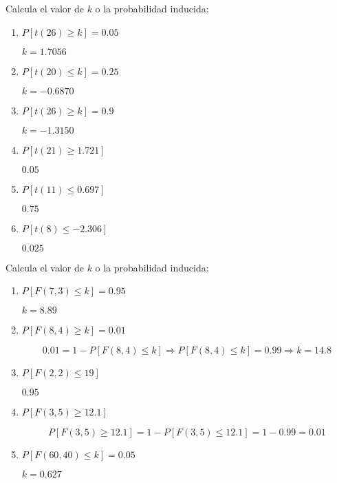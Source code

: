 \begin{ejercicio}
    Calcula el valor de $k$ o la probabilidad inducida:
    \begin{enumerate}[label=\alph*)]
        \item $P[t(26)\geq k] = 0.05$

            $k = 1.7056$
        \item $P[t(20)\leq k] = 0.25$

            $k = -0.6870$
        \item $P[t(26) \geq k] = 0.9$

            $k = -1.3150$
        \item $P[t(21) \geq 1.721]$

            $0.05$
        \item $P[t(11) \leq 0.697]$

            $0.75$
        \item $P[t(8) \leq -2.306]$

            $0.025$
    \end{enumerate}
\end{ejercicio}

\begin{ejercicio}
    Calcula el valor de $k$ o la probabilidad inducida:
    \begin{enumerate}[label=\alph*)]
        \item $P[F(7,3) \leq k] = 0.95$

            $k = 8.89$
        \item $P[F(8,4) \geq k] = 0.01$

            \begin{equation*}
                0.01 = 1 - P[F(8,4) \leq k] \Longrightarrow P[F(8,4) \leq k] = 0.99 \Longrightarrow k = 14.8
            \end{equation*}
        \item $P[F(2,2) \leq 19]$

            $0.95$
        \item $P[F(3,5) \geq 12.1]$

            \begin{equation*}
                P[F(3,5) \geq 12.1] = 1-P[F(3,5) \leq 12.1] = 1-0.99 = 0.01
            \end{equation*}
        \item $P[F(60,40) \leq k] = 0.05$

            $k = 0.627$
    \end{enumerate}
\end{ejercicio}

